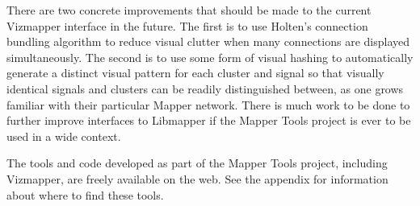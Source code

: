 There are two concrete improvements that should be made to the current Vizmapper interface in the future. The first is to use Holten's connection bundling algorithm \cite{edgebundles2006} to reduce visual clutter when many connections are displayed simultaneously. The second is to use some form of visual hashing to automatically generate a distinct visual pattern for each cluster and signal so that visually identical signals and clusters can be readily distinguished between, as one grows familiar with their particular Mapper network. There is much work to be done to further improve interfaces to Libmapper if the Mapper Tools project is ever to be used in a wide context. 

The tools and code developed as part of the Mapper Tools project, including Vizmapper, are freely available on the web. See the appendix for information about where to find these tools.
